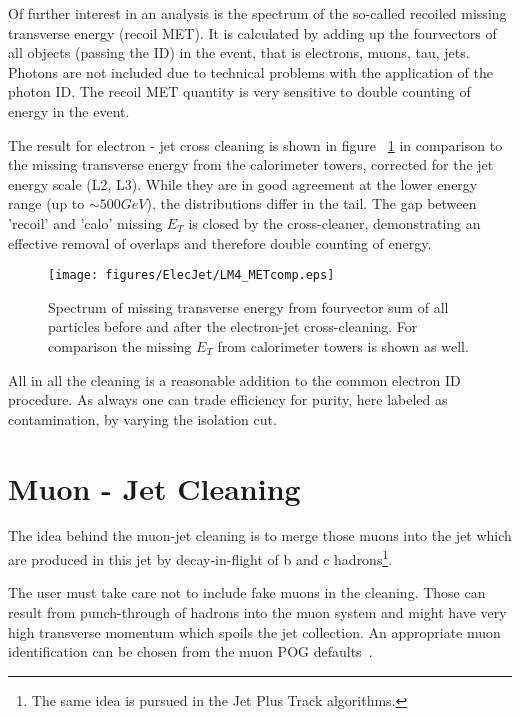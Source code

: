 \documentclass{cmspaper}
\begin{document}
Of further interest in an analysis is the spectrum of the so-called recoiled
missing transverse energy (recoil MET). It is calculated by adding up the
fourvectors of all objects (passing the ID) in the event, that is electrons,
muons, tau, jets. Photons are not included due to technical problems with the
application of the photon ID.  The recoil MET quantity is very sensitive to
double counting of energy in the event.

The result for electron - jet cross cleaning is shown in figure
~\ref{fig:met_ElecJet} in comparison to the missing transverse energy from the
calorimeter towers, corrected for the jet energy scale (L2, L3). While they are
in good agreement at the lower energy range (up to \(\sim 500 GeV\)), the
distributions differ in the tail. The gap between 'recoil' and 'calo' missing
$E_T$ is closed by the cross-cleaner, demonstrating an effective removal of
overlaps and therefore double counting of energy.

\begin{figure}[hb]
\begin{center}
    \texttt{[image: figures/ElecJet/LM4\_METcomp.eps]}
    \caption{Spectrum of missing transverse energy from fourvector sum of all
    particles before and after the electron-jet cross-cleaning. For comparison
    the missing $E_T$ from calorimeter towers is shown as well.}
\label{fig:met_ElecJet}
\end{center}
\end{figure}
All in all the cleaning is a reasonable addition to the
common electron ID procedure. As always one can trade efficiency for purity,
here labeled as contamination, by varying the isolation cut.

\clearpage


\section{Muon - Jet Cleaning}
The idea behind the muon-jet cleaning is to merge those muons into the jet which
are produced in this jet by decay-in-flight of b and c hadrons\footnote{The same
idea is pursued in the Jet Plus Track algorithms.}.

The user must take care not to include fake muons in the cleaning. Those can
result from punch-through of hadrons into the muon system and might have very
high transverse momentum which spoils the jet collection. An appropriate muon
identification can be chosen from the muon POG defaults~\cite{muonID}.
\end{document}
